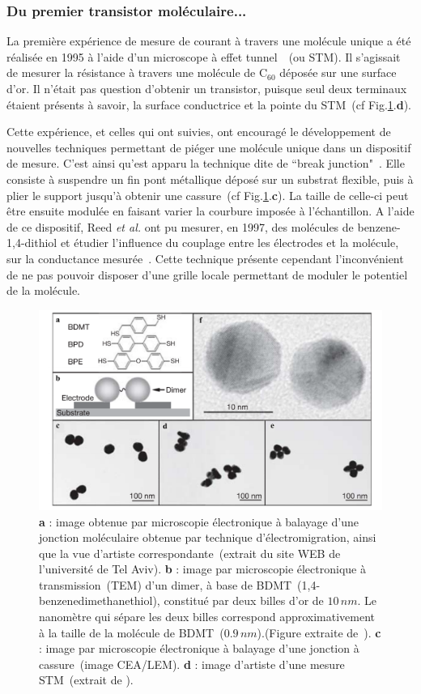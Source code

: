 \subsubsection*{Du premier transistor moléculaire...}
La première expérience de mesure de courant à travers une molécule unique a été réalisée en 1995 à l'aide d'un microscope à effet tunnel~\cite{Joachim1995}~(ou STM). Il s'agissait de mesurer la résistance à travers une molécule de C$_{60}$ déposée sur une surface d'or. Il n'était pas question d'obtenir un transistor, puisque seul deux terminaux étaient présents à savoir, la surface conductrice et la pointe du STM~(cf Fig.\ref{MolSpintro2}.\textbf{d}).

Cette expérience, et celles qui ont suivies, ont encouragé le développement de nouvelles techniques permettant de piéger une molécule unique dans un dispositif de mesure. C'est ainsi qu'est apparu la technique dite de ``break junction"~\cite{Zhou1995}. Elle consiste à suspendre un fin pont métallique déposé sur un substrat flexible, puis à plier le support jusqu'à obtenir une cassure~(cf Fig.\ref{MolSpintro2}.\textbf{c}). La taille de celle-ci peut être ensuite modulée en faisant varier la courbure imposée à l'échantillon. A l'aide de ce dispositif, Reed \textit{et al.} ont pu mesurer, en 1997, des molécules de benzene-1,4-dithiol et étudier l'influence du couplage entre les électrodes et la molécule, sur la conductance mesurée~\cite{Reed1997}. Cette technique présente cependant l'inconvénient de ne pas pouvoir disposer d'une grille locale permettant de moduler le potentiel de la molécule.

\begin{figure}
\centering \includegraphics[scale=0.45]{Spintronique/MolSpintro2/MolSpintro2.pdf}
\caption{\textbf{a} : image obtenue par microscopie électronique à balayage d'une jonction moléculaire obtenue par technique d'électromigration, ainsi que la vue d'artiste correspondante~(extrait du site WEB de l'université de Tel Aviv). \textbf{b} : image par microscopie électronique à transmission~(TEM) d'un dimer, à base de BDMT~(1,4-
benzenedimethanethiol), constitué par deux billes d'or de $10\,nm$. Le nanomètre qui sépare les deux billes correspond approximativement à la taille de la molécule de BDMT~($0.9\,nm$).(Figure extraite de~\cite{Dadosh2005}). \textbf{c} : image par microscopie électronique à balayage d'une jonction à cassure~(image CEA/LEM). \textbf{d} : image d'artiste d'une mesure STM~(extrait de \cite{Leary2011}).}
\label{MolSpintro2}
\end{figure}


